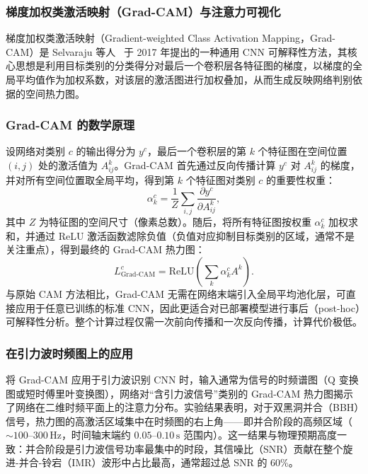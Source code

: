 \subsubsection*{梯度加权类激活映射（Grad-CAM）与注意力可视化}

梯度加权类激活映射（Gradient-weighted Class Activation Mapping，Grad-CAM）是 Selvaraju 等人~\cite{Selvaraju2017GradCAM} 于 2017 年提出的一种通用 CNN 可解释性方法，其核心思想是利用目标类别的分类得分对最后一个卷积层各特征图的梯度，以梯度的全局平均值作为加权系数，对该层的激活图进行加权叠加，从而生成反映网络判别依据的空间热力图。

\subsubsection*{Grad-CAM 的数学原理}

设网络对类别 $c$ 的输出得分为 $y^c$，最后一个卷积层的第 $k$ 个特征图在空间位置 $(i, j)$ 处的激活值为 $A^k_{ij}$。Grad-CAM 首先通过反向传播计算 $y^c$ 对 $A^k_{ij}$ 的梯度，并对所有空间位置取全局平均，得到第 $k$ 个特征图对类别 $c$ 的重要性权重：
\begin{equation}
  \alpha_k^c = \frac{1}{Z} \sum_{i,j} \frac{\partial y^c}{\partial A^k_{ij}},
\end{equation}
其中 $Z$ 为特征图的空间尺寸（像素总数）。随后，将所有特征图按权重 $\alpha_k^c$ 加权求和，并通过 ReLU 激活函数滤除负值（负值对应抑制目标类别的区域，通常不是关注重点），得到最终的 Grad-CAM 热力图：
\begin{equation}
  L^c_{\text{Grad-CAM}} = \text{ReLU}\!\left(\sum_k \alpha_k^c A^k\right).
\end{equation}
与原始 CAM 方法相比，Grad-CAM 无需在网络末端引入全局平均池化层，可直接应用于任意已训练的标准 CNN，因此更适合对已部署模型进行事后（post-hoc）可解释性分析。整个计算过程仅需一次前向传播和一次反向传播，计算代价极低。

\subsubsection*{在引力波时频图上的应用}

将 Grad-CAM 应用于引力波识别 CNN 时，输入通常为信号的时频谱图（Q 变换图或短时傅里叶变换图），网络对“含引力波信号”类别的 Grad-CAM 热力图揭示了网络在二维时频平面上的注意力分布。实验结果表明，对于双黑洞并合（BBH）信号，热力图的高激活区域集中在时频图的右上角——即并合阶段的高频区域（$\sim 100$--$300\,\text{Hz}$，时间轴末端约 $0.05$--$0.10\,\text{s}$ 范围内）。这一结果与物理预期高度一致：并合阶段是引力波信号功率最集中的时段，其信噪比（SNR）贡献在整个旋进-并合-铃宕（IMR）波形中占比最高，通常超过总 SNR 的 60\%。

